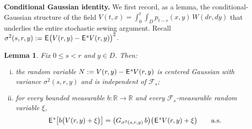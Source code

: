\documentclass[12pt]{article}
\newtheorem{lemma}[theorem]{Lemma}
\theoremstyle{definition}
\DeclareMathOperator{\1}{\mathbbm{1}}%
\def\E{\hskip.15ex\mathsf{E}\hskip.10ex}
\renewcommand{\le}{\leqslant}
\newcommand{\F}{\mathcal{F}}
\newcommand{\R}{\mathbb{R}}
\begin{document}
\noindent\textbf{Conditional Gaussian identity.}
We first record, as a lemma, the conditional-Gaussian structure of the field
$V(t,x)=\int_0^t\int_D p_{t-r}(x,y)\,W(dr,dy)$ that underlies the entire stochastic
sewing argument. Recall $\sigma^2(s,r,y):=\E\bigl(V(r,y)-\E^sV(r,y)\bigr)^2$.

\begin{lemma}\label{L:condgauss}
Fix $0\le s<r$ and $y\in D$. Then:
\begin{enumerate}[(i)]
\item the random variable $N:=V(r,y)-\E^sV(r,y)$ is centered Gaussian with variance
$\sigma^2(s,r,y)$ and is independent of $\F_s$;
\item for every bounded measurable $b\colon\R\to\R$ and every $\F_s$-measurable random
variable $\xi$,
\begin{equation}\label{eq:condgauss}
\E^s\bigl[b\bigl(V(r,y)+\xi\bigr)\bigr]
=\bigl(G_{\sigma^2(s,r,y)}\,b\bigr)\bigl(\E^sV(r,y)+\xi\bigr)\qquad\text{a.s.}
\end{equation}
\end{enumerate}
\end{lemma}
\end{document}
